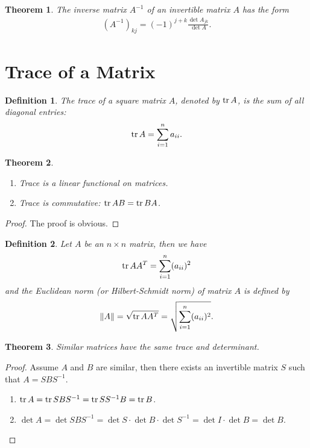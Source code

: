 \documentclass[11pt]{book}
\newtheorem{definition}{Definition}[section]
\newtheorem{theorem}{Theorem}[section]
\theoremstyle{definition}
\numberwithin{equation}{chapter}
\begin{document}
\begin{theorem}
The inverse matrix $A^{-1}$ of an invertible matrix $A$ has the form
\begin{align*}
    \left(A^{-1}\right)_{kj} = (-1)^{j+k} \frac{\det A_{jk}}{\det A}.
\end{align*}
\end{theorem}

\medskip

\section{Trace of a Matrix}
\begin{definition}\label{definition_trace}
The trace of a square matrix $A$, denoted by $\tr A$, is the sum of all diagonal entries:
\begin{align*}
    \tr A = \sum^n_{i=1} a_{ii}.
\end{align*}
\end{definition}

\medskip

\begin{theorem}
~\begin{enumerate}[label=(\alph*)]
    \item Trace is a linear functional on matrices.
    \item Trace is commutative: $\tr AB = \tr BA$.
\end{enumerate}
\end{theorem}
\begin{proof}
The proof is obvious.
\end{proof}

\medskip

\begin{definition}
Let $A$ be an $n\times n$ matrix, then we have 
\begin{align*}
    \tr AA^T = \sum^n_{i=1}(a_{ii})^2
\end{align*}
and the Euclidean norm (or Hilbert-Schmidt norm) of matrix $A$ is defined by \begin{align*}
    \|A\| = \sqrt{\tr AA^T} = \sqrt{\sum^n_{i=1}(a_{ii})^2}.
\end{align*}
\end{definition}

\medskip

\begin{theorem}\label{trace_property}
Similar matrices have the same trace and determinant.
\end{theorem}
\begin{proof}
Assume $A$ and $B$ are similar, then there exists an invertible matrix $S$ such that $A = SBS^{-1}$.
\begin{enumerate}[label=(\alph*)]
    \item $\tr A = \tr SBS^{-1} =\tr SS^{-1}B = \tr B$.
    \item $\det A = \det SBS^{-1} = \det S\cdot \det B \cdot \det S^{-1} = \det I\cdot \det B = \det B$.
\end{enumerate}
\end{proof}
\end{document}
